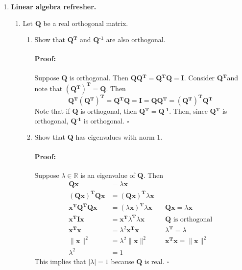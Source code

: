 \documentclass [11pt] {article}
\newcommand{\R}{\mathbb{R}}
\newcommand{\T}{\bf{T}}
\newcommand{\QQ}{\bf{Q}}
\newcommand{\QT}{\bf{Q$^{\bf{T}}$}}
\newcommand{\QI}{\bf{Q$^{\bf{-1}}$}}
\newcommand{\x}{\bf{x}}
\newenvironment{proof}{\begin{responseframe}\vspace{-10pt}\paragraph{Proof:}}{\hfill$\square$\end{responseframe}}
\renewcommand{\bf}[1]{\textbf{{#1}}}
\begin{document}
\begin{enumerate}
    \item \bf{Linear algebra refresher.}
        \begin{enumerate}
            \item 
                Let $\QQ$ be a real orthogonal matrix.
                \begin{enumerate}[itemsep=10pt]
                    \item Show that $\QT$ and $\QI$ are also orthogonal.
                        \begin{proof}
                            Suppose $\QQ$ is orthogonal. Then $\QQ \QT = \QT \QQ = \bf{I}$. 
                            Consider \QT and note that $\left(\QT\right)^{\bf{T}} = \QQ$. Then
                            \[\QT \left( \QT \right)^{\T} = \QT \QQ = \bf{I} = \QQ \QT = \left( \QT \right)^{\T} \QT\]
                            Note that if $\QQ$ is orthogonal, then $\QT = \QI$. Then, since $\QT$ is 
                            orthogonal, $\QI$ is orthogonal.
                        \end{proof}

                    \item Show that $\QQ$ has eigenvalues with norm 1.
                        \begin{proof}
                            Suppose $\lambda \in \R$ is an eigenvalue of $\QQ$. Then
                            \begin{align*}
                                \QQ \x &= \lambda \x \\
                                \left( \QQ \x \right)^{\T} \QQ \x &= \left( \QQ \x \right)^{\T} \lambda \x \\
                                \x^{\T} \QQ^{\T} \QQ \x &= \left( \lambda \x \right)^{\T} \lambda \x && \QQ \x = \lambda \x \\
                                \x^{\T} \bf{I} \x &= \x^{\T} \lambda^{\T} \lambda \x && \text{$\QQ$ is orthogonal} \\
                                \x^{\T} \x &= \lambda^2 \x^{\T} \x && \lambda^{\T} = \lambda \\
                                \|\x\|^2 &= \lambda^2 \|\x\|^2 && \x^{\T} \x = \|\x\|^2 \\
                                \lambda^2 &= 1
                            \end{align*}
                            This implies that $|\lambda| = 1$ because $\QQ$ is real.
                        \end{proof}


\end{enumerate}
\end{enumerate}
\end{enumerate}
\end{document}
